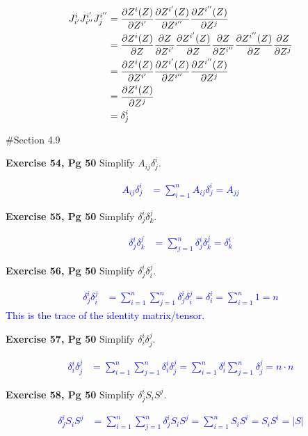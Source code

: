 \documentclass[12pt,a4paper]{report}
\newcommand{\BLUE}[1]{\textcolor{blue}{#1}}
\begin{document}
\begin{description}
	\BLUE{\begin{align*}
		J^{i}_{i'}J^{i'}_{i''}J^{i''}_{j}	&= \frac{\partial Z^{i}(Z)}{\partial Z^{i'}}\frac{\partial Z^{i'}(Z)}{\partial Z^{i''}}\frac{\partial Z^{i''}(Z)}{\partial Z^{j}} \\
		&= \frac{\partial Z^{i}(Z)}{\partial Z^{}}\frac{\partial Z}{\partial Z^{i'}}\frac{\partial Z^{i'}(Z)}{\partial Z^{}}\frac{\partial Z}{\partial Z^{i''}}\frac{\partial Z^{i''}(Z)}{\partial Z^{}}\frac{\partial Z}{\partial Z^j} \\
		&= \frac{\partial Z^i(Z)}{\partial Z^{i'}}\frac{\partial Z^{i'}(Z)}{\partial Z^{i''}}\frac{\partial Z^{i''}(Z)}{\partial Z^{j}} \\
		&= \frac{\partial Z^i(Z)}{\partial Z^{j}} \\
		&=  \delta^i_j
	\end{align*}
	}

#Section 4.9	
	\item \textbf{Exercise 54, Pg 50} Simplify $A_{ij}\delta^i_j$.
	
	\BLUE{\begin{align*}
		A_{ij}\delta^i_j &= \sum_{i=1}^n A_{ij}\delta^i_j = A_{jj}
	\end{align*}
	}
	
	\item \textbf{Exercise 55, Pg 50} Simplify $\delta^i_{j}\delta^j_k$.
	
	\BLUE{\begin{align*}
		\delta^i_{j}\delta^j_k &= \sum_{j=1}^n \delta^i_{j}\delta^j_k = \delta^i_k
	\end{align*}
	}
	
	\item \textbf{Exercise 56, Pg 50} Simplify $\delta^i_{j}\delta^j_i$.
	
	\BLUE{\begin{align*}
		\delta^i_{j}\delta^j_i &= \sum_{i=1}^n\sum_{j=1}^n \delta^i_{j}\delta^j_i = \delta^i_i = \sum_{i=1}^n 1 = n
	\end{align*}This is the trace of the identity matrix/tensor.
	}
	
	\item \textbf{Exercise 57, Pg 50} Simplify $\delta^i_{i}\delta^j_j$.
	
	\BLUE{\begin{align*}
		\delta^i_{i}\delta^j_j &= \sum_{i=1}^n\sum_{j=1}^n \delta^i_{i}\delta^j_j = \sum_{i=1}^n\delta^i_{i}\sum_{j=1}^n \delta^j_j = n\cdot n
	\end{align*}
	}
	
	\item \textbf{Exercise 58, Pg 50} Simplify $\delta^i_{j}S_iS^j$.
	
	\BLUE{\begin{align*}
		\delta^i_{j}S_iS^j &= \sum_{i=1}^n\sum_{j=1}^n \delta^i_{j}S_iS^j = \sum_{i=1}^n S_iS^i = S_iS^i = |S|
	\end{align*}
	}
	

\end{description}
\end{document}
